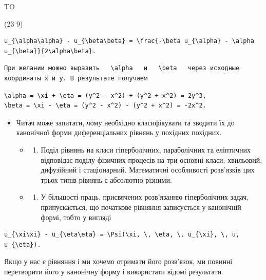 \documentclass[
  ukrainian,
]{article}
\providecommand{\tightlist}{%
  \setlength{\itemsep}{0pt}\setlength{\parskip}{0pt}}
\begin{document}
TO

(23 9)

\begin{verbatim}
u_{\alpha\alpha} - u_{\beta\beta} = \frac{-\beta u_{\alpha} - \alpha u_{\beta}}{2\alpha\beta}.
\end{verbatim}

\begin{verbatim}
При желании можно выразить   \alpha   и   \beta   через исходные координаты x и y. В результате получаем
\end{verbatim}

\begin{verbatim}
\alpha = \xi + \eta = (y^2 - x^2) + (y^2 + x^2) = 2y^3,
\beta = \xi - \eta = (y^2 - x^2) - (y^2 + x^2) = -2x^2.
\end{verbatim}

\begin{itemize}
\tightlist
\item
  Читач може запитати, чому необхідно класифікувати та зводити їх до
  канонічної форми диференціальних рівнянь у похідних похідних.

  \begin{itemize}
  \tightlist
  \item
    \begin{enumerate}
    \def\labelenumi{\alph{enumi})}
    \tightlist
    \item
      Поділ рівнянь на класи гіперболічних, параболічних та еліптичних
      відповідає поділу фізичних процесів на три основні класи:
      хвильовий, дифузійний і стаціонарний. Математичні особливості
      розв'язків цих трьох типів рівнянь є абсолютно різними.
    \end{enumerate}
  \item
    \begin{enumerate}
    \def\labelenumi{\alph{enumi})}
    \setcounter{enumi}{1}
    \tightlist
    \item
      У більшості праць, присвячених розв'язанню гіперболічних задач,
      припускається, що початкове рівняння записується у канонічній
      формі, тобто у вигляді
    \end{enumerate}
  \end{itemize}
\end{itemize}

\begin{verbatim}
u_{\xi\xi} - u_{\eta\eta} = \Psi(\xi, \, \eta, \, u_{\xi}, \, u, u_{\eta}).
\end{verbatim}

Якщо у нас є рівняння і ми хочемо отримати його розв'язок, ми повинні
перетворити його у канонічну форму і використати відомі результати.
\end{document}
